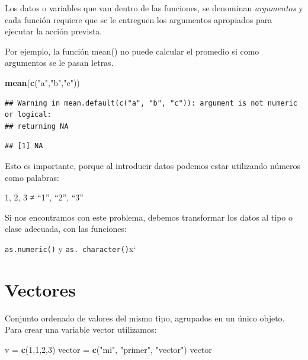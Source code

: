 \documentclass[
]{book}
\newenvironment{Shaded}{\begin{snugshade}}{\end{snugshade}}
\newcommand{\DecValTok}[1]{\textcolor[rgb]{0.00,0.00,0.81}{#1}}
\newcommand{\FunctionTok}[1]{\textcolor[rgb]{0.13,0.29,0.53}{\textbf{#1}}}
\newcommand{\NormalTok}[1]{#1}
\newcommand{\OtherTok}[1]{\textcolor[rgb]{0.56,0.35,0.01}{#1}}
\newcommand{\StringTok}[1]{\textcolor[rgb]{0.31,0.60,0.02}{#1}}
\begin{document}
Los datos o variables que van dentro de las funciones, se denominan
\emph{argumentos} y cada función requiere que se le entreguen los argumentos
apropiados para ejecutar la acción prevista.

Por ejemplo, la función mean() no puede calcular el promedio si como
argumentos se le pasan letras.

\begin{Shaded}
\begin{Highlighting}[]
\FunctionTok{mean}\NormalTok{(}\FunctionTok{c}\NormalTok{(}\StringTok{"a"}\NormalTok{,}\StringTok{"b"}\NormalTok{,}\StringTok{"c"}\NormalTok{))}
\end{Highlighting}
\end{Shaded}

\begin{verbatim}
## Warning in mean.default(c("a", "b", "c")): argument is not numeric or logical:
## returning NA
\end{verbatim}

\begin{verbatim}
## [1] NA
\end{verbatim}

Esto es importante, porque al introducir datos podemos estar utilizando
números como palabras:

1, 2, 3 ≠ ``1'', ``2'', ``3''

Si nos encontramos con este problema, debemos transformar los datos al
tipo o clase adecuada, con las funciones:

\texttt{as.numeric()} y \texttt{as.\ character()}x`

\hypertarget{vectores}{%
\section{Vectores}\label{vectores}}

Conjunto ordenado de valores del mismo tipo, agrupados en un único
objeto. Para crear una variable vector utilizamos:

\begin{Shaded}
\begin{Highlighting}[]
\NormalTok{v }\OtherTok{=} \FunctionTok{c}\NormalTok{(}\DecValTok{1}\NormalTok{,}\DecValTok{1}\NormalTok{,}\DecValTok{2}\NormalTok{,}\DecValTok{3}\NormalTok{)}
\NormalTok{vector }\OtherTok{=} \FunctionTok{c}\NormalTok{(}\StringTok{"mi"}\NormalTok{, }\StringTok{"primer"}\NormalTok{, }\StringTok{"vector"}\NormalTok{)}
\NormalTok{vector}
\end{Highlighting}
\end{Shaded}
\end{document}
